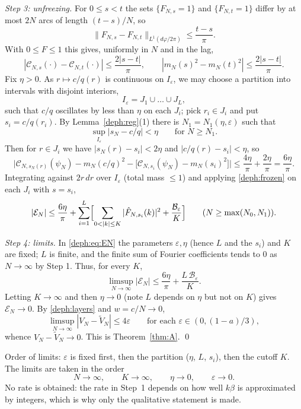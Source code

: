 \emph{Step 3: unfreezing.} For $0\le s<t$ the sets $\{F_{N,s}=1\}$ and $\{F_{N,t}=1\}$ differ by at most $2N$ arcs of length $(t-s)/N$, so
\begin{equation}\label{deph:eq:lip}
\|F_{N,s}-F_{N,t}\|_{L^1(d\varphi/2\pi)}\le\frac{t-s}{\pi}.
\end{equation}
With $0\le F\le1$ this gives, uniformly in $N$ and in the lag,
\[
|\mathcal C_{N,s}(\cdot)-\mathcal C_{N,t}(\cdot)|\le\frac{2|s-t|}\pi,\qquad |m_N(s)^2-m_N(t)^2|\le\frac{2|s-t|}\pi .
\]
Fix $\eta>0$. As $r\mapsto c/q(r)$ is continuous on $I_\varepsilon$, we may choose a partition into intervals with disjoint interiors,
\[
I_\varepsilon=J_1\cup\dots\cup J_L ,
\]
such that $c/q$ oscillates by less than $\eta$ on each $J_i$; pick $r_i\in J_i$ and put $s_i=c/q(r_i)$.
By Lemma~\ref{deph:reg}(1) there is $N_1=N_1(\eta,\varepsilon)$ such that
\[
\sup_{I_\varepsilon}|s_N-c/q|<\eta\qquad\text{for }N\ge N_1 .
\]
Then for $r\in J_i$ we have $|s_N(r)-s_i|<2\eta$ and $|c/q(r)-s_i|<\eta$, so
\[
\bigl|\mathcal C_{N,s_N(r)}(\psi_N)-m_N(c/q)^2-\bigl[\mathcal C_{N,s_i}(\psi_N)-m_N(s_i)^2\bigr]\bigr|\le\frac{4\eta}\pi+\frac{2\eta}\pi=\frac{6\eta}\pi .
\]
Integrating against $2r\,dr$ over $I_\varepsilon$ (total mass $\le1$) and applying \eqref{deph:frozen} on each $J_i$ with $s=s_i$,
\begin{equation}\label{deph:eq:EN}
|\mathcal E_N|\le\frac{6\eta}\pi+\sum_{i=1}^L\Bigl[\sum_{0<|k|\le K}|\hat F_{N,s_i}(k)|^2+\frac{\mathcal B_\varepsilon}K\Bigr]
\qquad(N\ge\max(N_0,N_1)).
\end{equation}

\emph{Step 4: limits.} In \eqref{deph:eq:EN} the parameters $\varepsilon,\eta$ (hence $L$ and the $s_i$) and $K$ are fixed; $L$ is finite, and
the finite sum of Fourier coefficients tends to $0$ as $N\to\infty$ by Step 1. Thus, for every $K$,
\[
\limsup_{N\to\infty}|\mathcal E_N|\le\frac{6\eta}\pi+\frac{L\,\mathcal B_\varepsilon}K .
\]
Letting $K\to\infty$ and then $\eta\to0$ (note $L$ depends on $\eta$ but not on $K$) gives $\mathcal E_N\to0$. By \eqref{deph:layers} and $w=c/N\to0$,
\[
\limsup_{N\to\infty}|V_N-\widetilde V_N|\le4\varepsilon\qquad\text{for each }\varepsilon\in(0,(1-a)/3),
\]
whence $V_N-\widetilde V_N\to0$. This is Theorem~\ref{thm:A}. \qed

\begin{remark}
Order of limits: $\varepsilon$ is fixed first, then the partition ($\eta$, $L$, $s_i$), then the cutoff $K$. The limits are taken in the order
\[
N\to\infty,\qquad K\to\infty,\qquad \eta\to0,\qquad \varepsilon\to0 .
\]
No rate is obtained: the rate in Step~1 depends on how well $k\beta$ is
approximated by integers, which is why only the qualitative statement is made.
\end{remark}
